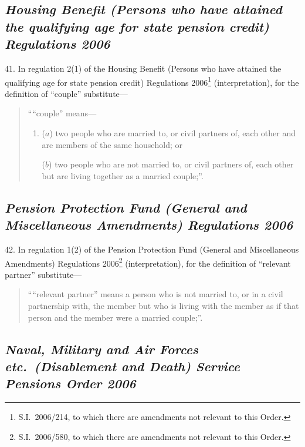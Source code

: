 \documentclass[12pt,a4paper]{article}
\begin{document}
\subsection*{\itshape Housing Benefit (Persons who have attained the qualifying age for state pension credit) Regulations 2006}

41.  In regulation 2(1) of the Housing Benefit (Persons who have attained the qualifying age for state pension credit) Regulations 2006\footnote{S.I.\ 2006/214, to which there are amendments not relevant to this Order.} (interpretation), for the definition of “couple” substitute—
\begin{quotation}
““couple” means—
\begin{enumerate}\item[]
($a$) 
two people who are married to, or civil partners of, each other and are members of the same household; or

($b$) 
two people who are not married to, or civil partners of, each other but are living together as a married couple;”.
\end{enumerate}
\end{quotation}

\subsection*{\itshape Pension Protection Fund (General and Miscellaneous Amendments) Regulations 2006}

42.  In regulation 1(2) of the Pension Protection Fund (General and Miscellaneous Amendments) Regulations 2006\footnote{S.I.\ 2006/580, to which there are amendments not relevant to this Order.} (interpretation), for the definition of “relevant partner” substitute—
\begin{quotation}
““relevant partner” means a person who is not married to, or in a civil partnership with, the member but who is living with the member as if that person and the member were a married couple;”.
\end{quotation}

\subsection*{\itshape Naval, Military and Air Forces etc.\ (Disablement and Death) Service Pensions Order 2006}
\end{document}
